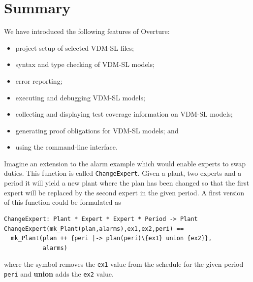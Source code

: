 {\lstset{style=mystyle,language=VDM-SL}

\section{Summary}

We have introduced the following features of Overture:
\begin{itemize}
\item project setup of selected VDM-SL files;
\item syntax and type checking of VDM-SL models;
\item error reporting;
\item executing and debugging VDM-SL models; 
\item collecting and displaying test coverage information on VDM-SL models;
\item generating proof obligations for VDM-SL models; and
\item using the command-line interface. 
\end{itemize}


\begin{myhardexercise}
\label{ex:tool-alarm} Imagine an extension to the alarm example which
would enable experts to swap duties. This function is called
\texttt{ChangeExpert}. Given a plant, two experts and a period it will
yield a new plant where the plan has been changed so that the first
expert will be replaced by the second expert in the given period. A
first version of this function could be formulated as
\begin{lstlisting}
ChangeExpert: Plant * Expert * Expert * Period -> Plant
ChangeExpert(mk_Plant(plan,alarms),ex1,ex2,peri) ==
  mk_Plant(plan ++ {peri |-> plan(peri)\{ex1} union {ex2}},
           alarms)
\end{lstlisting}
\noindent where the \texttt{\SETDIFF} symbol removes the \texttt{ex1}
value from the schedule for the given period \texttt{peri} and
{\bf\ttfamily union} adds the \texttt{ex2} value.


\end{myhardexercise}}
